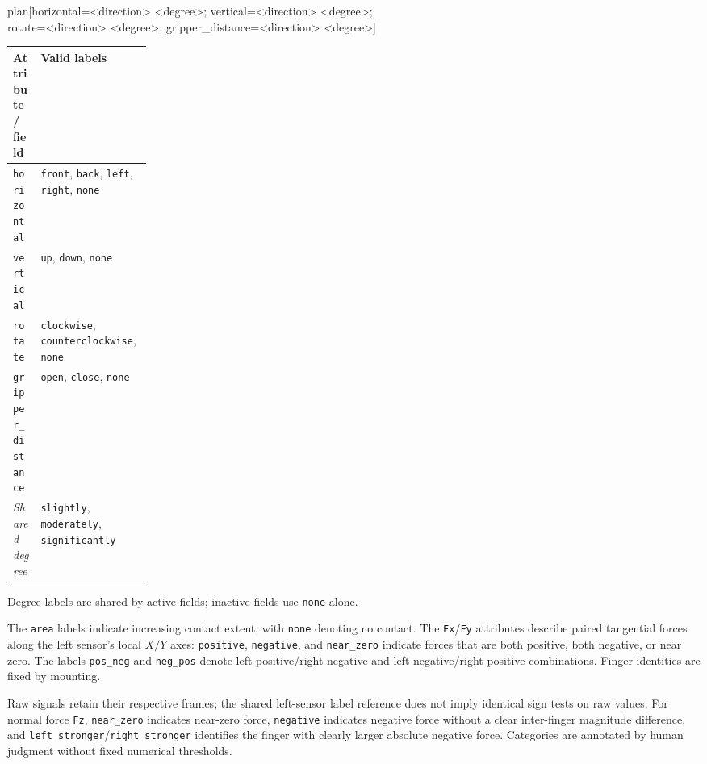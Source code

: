 \begin{table}[t]
\begin{minipage}{\textwidth}
{\footnotesize\ttfamily\raggedright
plan[horizontal=<direction> <degree>; vertical=<direction> <degree>;\\
\hspace*{2.5em}rotate=<direction> <degree>; gripper\_distance=<direction> <degree>]\par}
\vspace{5pt}
\setlength{\tabcolsep}{5pt}
\renewcommand{\arraystretch}{1.15}
\begin{tabularx}{\linewidth}{@{}p{0.20\linewidth}>{\raggedright\arraybackslash}X@{}}
\toprule
\textbf{Attribute / field} & \textbf{Valid labels} \\
\midrule
\texttt{horizontal} & \texttt{front}, \texttt{back}, \texttt{left}, \texttt{right}, \texttt{none} \\
\texttt{vertical} & \texttt{up}, \texttt{down}, \texttt{none} \\
\texttt{rotate} & \texttt{clockwise}, \texttt{counterclockwise}, \texttt{none} \\
\texttt{gripper\_distance} & \texttt{open}, \texttt{close}, \texttt{none} \\
\midrule
\textit{Shared degree} & \texttt{slightly}, \texttt{moderately}, \texttt{significantly} \\
\bottomrule
\end{tabularx}

\vspace{2pt}
{\footnotesize\raggedright
Degree labels are shared by active fields; inactive fields use \texttt{none} alone.\par}
\end{minipage}
\end{table}

The \texttt{area} labels indicate increasing contact extent, with \texttt{none} denoting no contact. The \texttt{Fx}/\texttt{Fy} attributes describe paired tangential forces along the left sensor's local $X/Y$ axes: \texttt{positive}, \texttt{negative}, and \texttt{near\_zero} indicate forces that are both positive, both negative, or near zero. The labels \texttt{pos\_neg} and \texttt{neg\_pos} denote left-positive/right-negative and left-negative/right-positive combinations. Finger identities are fixed by mounting.

Raw signals retain their respective frames; the shared left-sensor label reference does not imply identical sign tests on raw values. For normal force \texttt{Fz}, \texttt{near\_zero} indicates near-zero force, \texttt{negative} indicates negative force without a clear inter-finger magnitude difference, and \texttt{left\_stronger}/\texttt{right\_stronger} identifies the finger with clearly larger absolute negative force. Categories are annotated by human judgment without fixed numerical thresholds.

